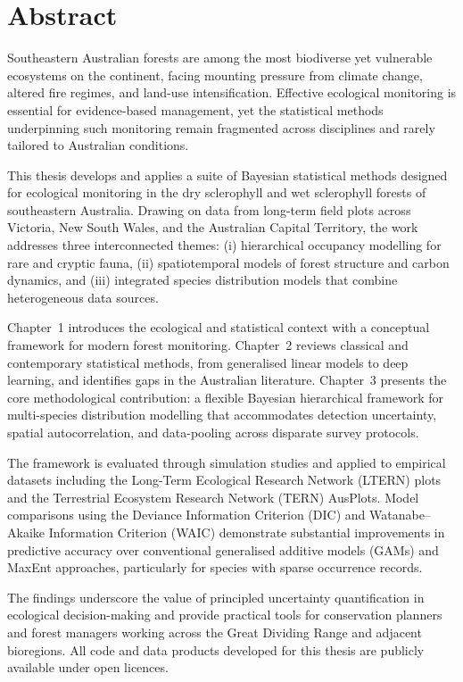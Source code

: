 \chapter*{Abstract}

\vspace{12pt}

Southeastern Australian forests are among the most biodiverse yet vulnerable
ecosystems on the continent, facing mounting pressure from climate change,
altered fire regimes, and land-use intensification. Effective ecological
monitoring is essential for evidence-based management, yet the statistical
methods underpinning such monitoring remain fragmented across disciplines and
rarely tailored to Australian conditions.

This thesis develops and applies a suite of Bayesian statistical methods
designed for ecological monitoring in the dry sclerophyll and wet sclerophyll
forests of southeastern Australia. Drawing on data from long-term field plots
across Victoria, New South Wales, and the Australian Capital Territory, the
work addresses three interconnected themes: (i) hierarchical occupancy
modelling for rare and cryptic fauna, (ii) spatiotemporal models of forest
structure and carbon dynamics, and (iii) integrated species distribution models
that combine heterogeneous data sources.

Chapter~1 introduces the ecological and statistical context with a conceptual
framework for modern forest monitoring. Chapter~2 reviews classical and
contemporary statistical methods, from generalised linear models to deep
learning, and identifies gaps in the Australian literature. Chapter~3 presents
the core methodological contribution: a flexible Bayesian hierarchical
framework for multi-species distribution modelling that accommodates
detection uncertainty, spatial autocorrelation, and data-pooling across
disparate survey protocols.

The framework is evaluated through simulation studies and applied to empirical
datasets including the Long-Term Ecological Research Network (LTERN) plots and
the Terrestrial Ecosystem Research Network (TERN) AusPlots. Model comparisons
using the Deviance Information Criterion (DIC) and Watanabe--Akaike Information
Criterion (WAIC) demonstrate substantial improvements in predictive accuracy
over conventional generalised additive models (GAMs) and MaxEnt approaches,
particularly for species with sparse occurrence records.

The findings underscore the value of principled uncertainty quantification in
ecological decision-making and provide practical tools for conservation
planners and forest managers working across the Great Dividing Range and
adjacent bioregions. All code and data products developed for this thesis are
publicly available under open licences.

